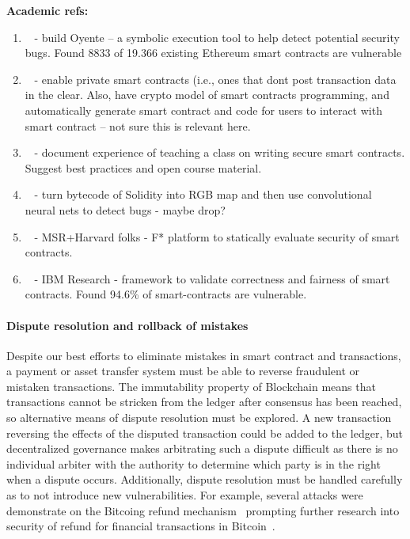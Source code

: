 \noindent
\textbf{Academic refs:}
\begin{enumerate}
\item~\cite{CCS:LCOSH16} - build Oyente -- a symbolic execution tool to help detect potential security bugs.  Found 8833 of 19.366 existing Ethereum smart contracts are vulnerable
\item~\cite{SP:KMSWP16} - enable private smart contracts (i.e., ones that dont post transaction data in the clear.  Also, have crypto model of smart contracts programming, and automatically generate smart contract and code for users to interact with smart contract -- not sure this is relevant here.
\item~\cite{FC:DAKMS16} - document experience of teaching a class on writing secure smart contracts.  Suggest best practices and open course material.
\item~\cite{arxiv:Huang18} - turn bytecode of Solidity into RGB map and then use convolutional neural nets to detect bugs - maybe drop?
\item~\cite{CCS:BDFGGK+16} - MSR+Harvard folks - F* platform to statically evaluate security of smart contracts.
\item~\cite{NDSS:KGDS18} - IBM Research - framework to validate correctness and fairness of smart contracts.  Found 94.6\% of smart-contracts are vulnerable.
\end{enumerate}

\paragraph{Dispute resolution and rollback of mistakes}
Despite our best efforts to eliminate mistakes in smart contract and transactions, a payment or asset transfer system must be able to reverse fraudulent or mistaken transactions. The immutability property of Blockchain means that transactions cannot be stricken from the ledger after consensus has been reached, so alternative means of dispute resolution must be explored. A new transaction reversing the effects of the disputed transaction could be added to the ledger, but decentralized governance makes arbitrating such a dispute difficult as there is no individual arbiter with the authority to determine which party is in the right when a dispute occurs.  Additionally, dispute resolution must be handled carefully as to not introduce new vulnerabilities.  For example, several attacks were demonstrate on the Bitcoing refund mechanism~\cite{FC:MccShaHao16} prompting further research into security of refund for financial transactions in Bitcoin~\cite{arxiv:AviSafSha18}.

